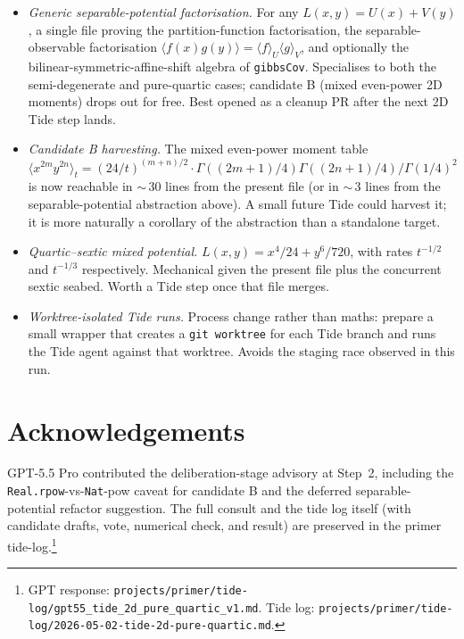 \documentclass[11pt]{article}
\begin{document}
\begin{itemize}
\item \emph{Generic separable-potential factorisation.} For any
$L(x,y) = U(x) + V(y)$, a single file proving the partition-function
factorisation, the separable-observable factorisation
$\langle f(x) g(y)\rangle = \langle f\rangle_U \langle g\rangle_V$,
and optionally the bilinear-symmetric-affine-shift algebra of
\texttt{gibbsCov}. Specialises to both the semi-degenerate and
pure-quartic cases; candidate B (mixed even-power 2D moments) drops
out for free. Best opened as a cleanup PR after the next 2D Tide step
lands.

\item \emph{Candidate B harvesting.} The mixed even-power moment table
$\langle x^{2m} y^{2n}\rangle_t = (24/t)^{(m+n)/2} \cdot \Gamma((2m+1)/4)
\Gamma((2n+1)/4)/\Gamma(1/4)^2$ is now reachable in $\sim$\,30 lines from
the present file (or in $\sim$\,3 lines from the separable-potential
abstraction above). A small future Tide could harvest it; it is more
naturally a corollary of the abstraction than a standalone target.

\item \emph{Quartic--sextic mixed potential.} $L(x,y) = x^4/24 +
y^6/720$, with rates $t^{-1/2}$ and $t^{-1/3}$ respectively. Mechanical
given the present file plus the concurrent sextic seabed. Worth a Tide
step once that file merges.

\item \emph{Worktree-isolated Tide runs.} Process change rather than
maths: prepare a small wrapper that creates a \texttt{git worktree}
for each Tide branch and runs the Tide agent against that worktree.
Avoids the staging race observed in this run.
\end{itemize}

\section*{Acknowledgements}

GPT-5.5 Pro contributed the deliberation-stage advisory at Step~2,
including the \texttt{Real.rpow}-vs-\texttt{Nat}-pow caveat for
candidate B and the deferred separable-potential refactor suggestion.
The full consult and the tide log itself (with candidate drafts, vote,
numerical check, and result) are preserved in the primer
tide-log.\footnote{GPT response:
\texttt{projects/primer/tide-log/gpt55\_tide\_2d\_pure\_quartic\_v1.md}.
Tide log:
\texttt{projects/primer/tide-log/2026-05-02-tide-2d-pure-quartic.md}.}
\end{document}
